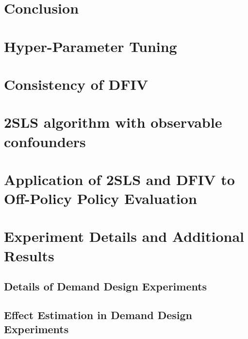 \documentclass{article}
\begin{document}
\section{Conclusion}




\appendix
\newpage

%

\section{Hyper-Parameter Tuning}\label{sec:hyper-param}


\section{Consistency of DFIV}\label{sec:consistency}


\section{2SLS algorithm with observable confounders}
\label{sec:observable-confounder}


\section{Application of 2SLS and DFIV to Off-Policy Policy Evaluation}
\label{sec:ope-2sls}

\section{Experiment Details and Additional Results}
\label{sec:data-generation-process}
\subsection{Details of Demand Design Experiments} \label{sec:data-generation-process-demand}

\subsection{Effect Estimation in Demand Design Experiments} \label{sec:demand-causal-experiments}

\end{document}
